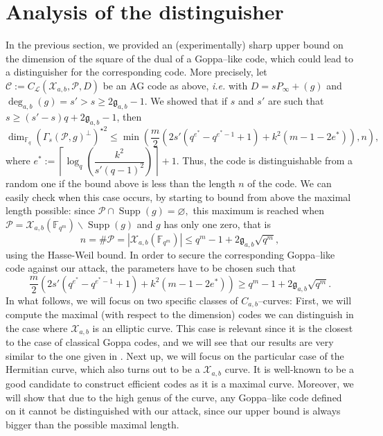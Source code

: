 \documentclass[a4paper]{article}
\theoremstyle{definition}
\theoremstyle{remark}
\newcommand{\calP}{\mathcal{P}}
\newcommand{\calL}{\mathcal{L}}
\newcommand{\calC}{\mathcal{C}}
\newcommand{\calX}{\mathcal{X}}
\newcommand{\fqm}{\mathbb{F}_{q^m}}
\newcommand{\fq}{\mathbb{F}_{q}}
\newcommand{\Supp}{\operatorname{Supp}}
\newcommand{\degab}[1]{\deg_{a,b}\left(#1\right)}
\begin{document}
\section{Analysis of the distinguisher}\label{sec:analysis}
\noindent In the previous section, we provided an (experimentally) sharp upper bound on the dimension of the square of the dual of a Goppa--like code, which could lead to a distinguisher for the corresponding code. 
\noindent More precisely, let $\calC := C_\calL(\calX_{a,b},\calP,D)$ be an AG code as above, \emph{i.e.} with $D = sP_\infty +(g)$ and $\degab{g} = s'>s\geq 2\mathfrak{g}_{a,b}-1$. We showed that if $s$ and $s'$ are such that $s \geq (s'-s)q+2\mathfrak{g}_{a,b}-1$, then
\begin{equation} \label{eq:best_upper_bound}
\dim_{\fq} (\Gamma_s(\calP,g)^{\perp})^{\star 2} \leq \min \left(\frac{m}{2}\left(2s'(q^{e^*}-q^{e^*-1}+1)+k^2(m-1-2e^*)  \right),n\right),
\end{equation}
where $e^* := \left\lceil \log_q\left(\dfrac{k^2}{s'(q-1)^2}\right)\right\rceil+1$. Thus, the code is distinguishable from a random one if the bound above is less than the length $n$ of the code. We can easily check when this case occurs, by starting to bound from above the maximal length possible: since $\calP \cap \Supp(g) = \varnothing,$ this maximum is reached when $\calP = \calX_{a,b}(\fqm) \backslash \Supp(g)$ and $g$ has only one zero, that is
$$n = \# \calP = |\calX_{a,b}(\fqm)| \leq q^m-1+2\mathfrak{g}_{a,b}\sqrt{q^m},$$
using the Hasse-Weil bound. In order to secure the corresponding Goppa--like code against our attack, the parameters have to be chosen such that 
\begin{equation} \label{eq:cond_not_to_distinguish}
\frac{m}{2}\left(2s'(q^{e^*}-q^{e^*-1}+1)+k^2(m-1-2e^*)  \right)\geq q^m-1+2\mathfrak{g}_{a,b}\sqrt{q^m}.
\end{equation}
\noindent In what follows, we will focus on two specific classes of $C_{a,b}$--curves: First, we will compute the maximal (with respect to the dimension) codes we can distinguish in the case where $\calX_{a,b}$ is an elliptic curve. This case is relevant since it is the closest to the case of classical Goppa codes, and we will see that our results are very similar to the one given in \cite{MT21}. Next up, we will focus on the particular case of the Hermitian curve, which also turns out to be a $\calX_{a,b}$ curve. It is well-known to be a good candidate to construct efficient codes as it is a maximal curve. Moreover, we will show that due to the high genus of the curve, any Goppa--like code defined on it cannot be distinguished with our attack, since our upper bound is always bigger than the possible maximal length.
\end{document}
